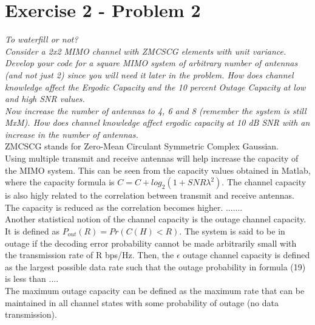 \section{Exercise 2 - Problem 2}
\textit{To waterfill or not?}\\

\textit{Consider a 2x2 MIMO channel with ZMCSCG elements with unit variance. Develop your code for a square MIMO system of arbitrary number of antennas (and not just 2) since you will need it later in the problem. How does channel knowledge affect the Ergodic Capacity and the 10 percent Outage Capacity at low and high SNR values.} \\

\textit{Now increase the number of antennas to 4, 6 and 8 (remember the system is still MxM). How does channel knowledge affect ergodic capacity at 10 dB SNR with an increase in the number of antennas.}\\

ZMCSCG stands for Zero-Mean Circulant Symmetric Complex Gaussian. \\

Using multiple transmit and receive antennas will help increase the capacity of the MIMO system. This can be seen from the capacity values obtained in Matlab, where the capacity formula is $C=C+log_{2}(1+SNR \lambda ^{2})$. The channel capacity is also higly related to the correlation between transmit and receive antennas. The capacity is reduced as the correlation becomes higher. .......\\

Another statistical notion of the channel capacity is the outage channel capacity. It is defined as $P_{out}(R)=Pr(C(H)<R)$. The system is said to be in outage if the decoding error probability cannot be made arbitrarily small with the transmission rate of R bps/Hz. Then, the $\epsilon$ outage channel capacity is defined as the largest possible data rate such that the outage probability in formula (19) is less than .... \\

The maximum outage capacity can be defined as the maximum rate that can be maintained in all channel states with some probability of outage (no data transmission).
